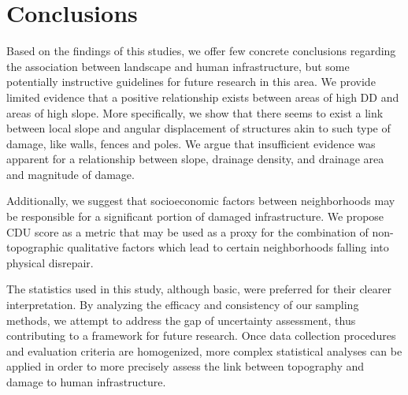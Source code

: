 \documentclass[final,12pt,times,twocolumn,authoryear]{elsarticle}
\begin{document}
\section{Conclusions}
\label{s:conc}

Based on the findings of this studies, we offer few concrete conclusions regarding the association between landscape and human infrastructure, but some potentially instructive guidelines for future research in this area. We provide limited evidence that a positive relationship exists between areas of high DD and areas of high slope. More specifically, we show that there seems to exist a link between local slope and angular displacement of structures akin to such type of damage, like walls, fences and poles. We argue that insufficient evidence was apparent for a relationship between slope, drainage density, and drainage area and magnitude of damage.

Additionally, we suggest that socioeconomic factors between neighborhoods may be responsible for a significant portion of damaged infrastructure. We propose CDU score as a metric that may be used as a proxy for the combination of non-topographic qualitative factors which lead to certain neighborhoods falling into physical disrepair.

The statistics used in this study, although basic, were preferred for their clearer interpretation. By analyzing the efficacy and consistency of our sampling methods, we attempt to address the gap of uncertainty assessment, thus contributing to a framework for future research. Once data collection procedures and evaluation criteria are homogenized, more complex statistical analyses can be applied in order to more precisely assess the link between topography and damage to human infrastructure. 




 



\end{document}
